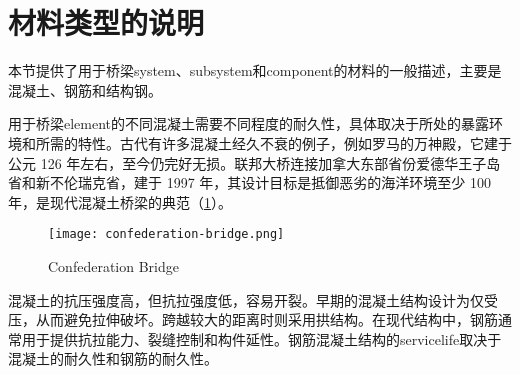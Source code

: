 \section{材料类型的说明}
\label{sec:material-types}

本节提供了用于桥梁\gls*{system}、\gls*{subsystem}和\gls*{component}的材料的一般描述，主要是混凝土、钢筋和结构钢。

用于桥梁\gls*{element}的不同混凝土需要不同程度的耐久性，具体取决于所处的暴露环境和所需的特性。古代有许多混凝土经久不衰的例子，例如罗马的万神殿，它建于公元 126 年左右，至今仍完好无损。联邦大桥连接加拿大东部省份爱德华王子岛省和新不伦瑞克省，建于 1997 年，其设计目标是抵御恶劣的海洋环境至少 100 年，是现代混凝土桥梁的典范（\cref{fig:confederation-bridge}）。

\begin{figure}
  \texttt{[image: confederation-bridge.png]}
  \caption{Confederation Bridge}\label{fig:confederation-bridge}
\end{figure}

混凝土的抗压强度高，但抗拉强度低，容易开裂。早期的混凝土结构设计为仅受压，从而避免拉伸破坏。跨越较大的距离时则采用拱结构。在现代结构中，钢筋通常用于提供抗拉能力、裂缝控制和构件延性。钢筋混凝土结构的\gls*{servicelife}取决于混凝土的耐久性和钢筋的耐久性。

